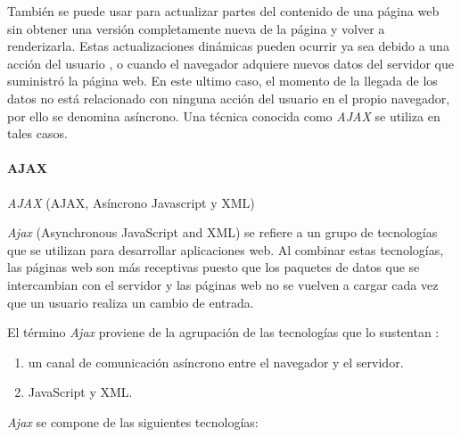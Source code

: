 También se puede usar para actualizar partes del contenido de una página web sin
obtener una versión completamente nueva de la página y volver a renderizarla. Estas actualizaciones dinámicas pueden ocurrir ya sea debido a una acción del usuario , o cuando
el navegador adquiere nuevos datos del servidor que suministró la página web. 
En este ultimo caso,  el momento de la llegada de los datos no está relacionado con ninguna acción del usuario en el propio navegador, por ello se denomina asíncrono. Una técnica conocida como \textit{AJAX}  se utiliza en tales casos.



\paragraph{AJAX}
\textit{AJAX}  (AJAX, Asíncrono Javascript y XML)  

\textit{Ajax} (Asynchronous JavaScript and XML) se refiere a un grupo de tecnologías que se utilizan para desarrollar aplicaciones web. Al combinar estas tecnologías, las páginas web son más receptivas puesto que los paquetes  de datos que se intercambian con el servidor y las páginas web no se vuelven a cargar cada vez que un usuario realiza un cambio de entrada. 

El término \textit{Ajax}  proviene de la agrupación de las tecnologías que lo sustentan : 
\begin{enumerate}
	\item un canal de comunicación asíncrono entre el navegador y el servidor.
	\item JavaScript y XML.
\end{enumerate}

\textit{Ajax} se compone de las siguientes tecnologías:

